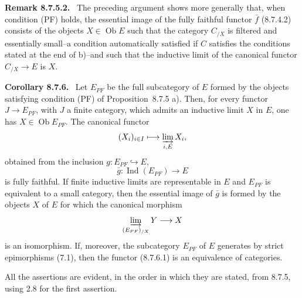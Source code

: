 \documentclass[11pt]{article}
\newcommand{\Ob}{\operatorname{Ob}}
\newcommand{\Ind}{\operatorname{Ind}}
\newenvironment{statement}[1]{\par\medskip\noindent\textbf{#1.}\ }{\par\medskip}
\begin{document}
\begin{statement}{Remark 8.7.5.2}
The preceding argument shows more generally that, when condition \textup{(PF)} holds, the essential image of the fully faithful functor $\bar f$ (8.7.4.2) consists of the objects $X\in\Ob E$ such that the category $C_{/X}$ is filtered and essentially small--a condition automatically satisfied if $C$ satisfies the conditions stated at the end of b)--and such that the inductive limit of the canonical functor $C_{/X}\to E$ is $X$.
\end{statement}

\begin{statement}{Corollary 8.7.6}
Let $E_{PF}$ be the full subcategory of $E$ formed by the objects satisfying condition \textup{(PF)} of Proposition~8.7.5 a). Then, for every functor $J\to E_{PF}$, with $J$ a finite category, which admits an inductive limit $X$ in $E$, one has $X\in\Ob E_{PF}$. The canonical functor
\[
 (X_i)_{i\in I}\longmapsto \varinjlim_{i,E}X_i,
\]
obtained from the inclusion $g:E_{PF}\hookrightarrow E$,
\[
 \bar g:\Ind(E_{PF})\longrightarrow E
\tag{8.7.6.1}
\]
is fully faithful. If finite inductive limits are representable in $E$ and $E_{PF}$ is equivalent to a small category, then the essential image of $\bar g$ is formed by the objects $X$ of $E$ for which the canonical morphism
\[
 \varinjlim_{(E_{PF})_{/X}}Y\longrightarrow X
\]
is an isomorphism. If, moreover, the subcategory $E_{PF}$ of $E$ generates by strict epimorphisms (7.1), then the functor (8.7.6.1) is an equivalence of categories.
\end{statement}

All the assertions are evident, in the order in which they are stated, from 8.7.5, using 2.8 for the first assertion.
\end{document}
